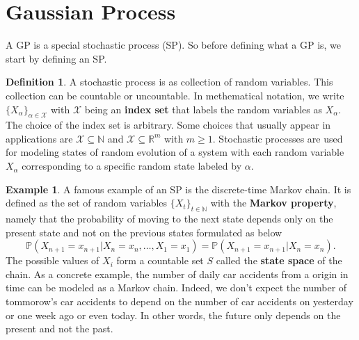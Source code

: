 \documentclass[10pt]{article}
\theoremstyle{definition}
\newtheorem{defn}{Definition}[section]
\newtheorem{exmp}{Example}[section]
\begin{document}
\section{Gaussian Process}
 A GP is a special stochastic process (SP). So before defining what a GP is, we start by defining an SP.
 \begin{defn}
 A stochastic process is as collection of random variables. This collection can be countable or uncountable. In methematical notation, we write $\{X_{\alpha}\}_{\alpha\in \mathcal{X}}$ with $\mathcal{X}$ being an \textbf{index set} that labels the random variables as $X_{\alpha}$. The choice of the index set is arbitrary. Some choices that usually appear in applications are $\mathcal{X}\subseteq\mathbb{N}$ and $\mathcal{X}\subseteq\mathbb{R}^{m}$ with $m \ge 1$. Stochastic processes are used for modeling states of random evolution of a system with each random variable $X_{\alpha}$ corresponding to a specific random state labeled by $\alpha$.
 \end{defn}
 \begin{exmp}
 A famous example of an SP is the discrete-time Markov chain. It is defined as the set of random variables $\{X_t\}_{t\in\mathbb{N}}$ with the \textbf{Markov property}, namely that the probability of moving to the next state depends only on the present state and not on the previous states formulated as below
 \begin{equation*}
 \mathbb{P}(X_{n+1} = x_{n+1} | X_{n} = x_{n},\dots,X_{1} = x_{1}) =  \mathbb{P}(X_{n+1} = x_{n+1}|X_{n} = x_{n}).
 \end{equation*}
 The possible values of $X_i$ form a countable set $S$ called the \textbf{state space} of the chain. As a concrete example, the number of daily car accidents from a origin in time can be modeled as a Markov chain. Indeed, we don't expect the number of tommorow's car accidents to depend on the number of car accidents on yesterday or one week ago or even today. In other words, the future only depends on the present and not the past.
 \end{exmp}
 
\end{document}
